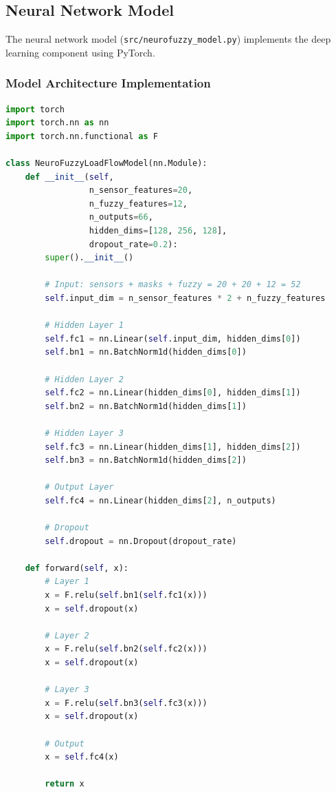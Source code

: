 \documentclass[12pt,a4paper]{report}
\begin{document}
\subsection{Neural Network Model}

The neural network model (\texttt{src/neurofuzzy\_model.py}) implements the deep learning component using PyTorch.

\subsubsection{Model Architecture Implementation}

\begin{lstlisting}[language=Python, caption={Neural Network Architecture}]
import torch
import torch.nn as nn
import torch.nn.functional as F

class NeuroFuzzyLoadFlowModel(nn.Module):
    def __init__(self, 
                 n_sensor_features=20,
                 n_fuzzy_features=12,
                 n_outputs=66,
                 hidden_dims=[128, 256, 128],
                 dropout_rate=0.2):
        super().__init__()
        
        # Input: sensors + masks + fuzzy = 20 + 20 + 12 = 52
        self.input_dim = n_sensor_features * 2 + n_fuzzy_features
        
        # Hidden Layer 1
        self.fc1 = nn.Linear(self.input_dim, hidden_dims[0])
        self.bn1 = nn.BatchNorm1d(hidden_dims[0])
        
        # Hidden Layer 2
        self.fc2 = nn.Linear(hidden_dims[0], hidden_dims[1])
        self.bn2 = nn.BatchNorm1d(hidden_dims[1])
        
        # Hidden Layer 3
        self.fc3 = nn.Linear(hidden_dims[1], hidden_dims[2])
        self.bn3 = nn.BatchNorm1d(hidden_dims[2])
        
        # Output Layer
        self.fc4 = nn.Linear(hidden_dims[2], n_outputs)
        
        # Dropout
        self.dropout = nn.Dropout(dropout_rate)
        
    def forward(self, x):
        # Layer 1
        x = F.relu(self.bn1(self.fc1(x)))
        x = self.dropout(x)
        
        # Layer 2
        x = F.relu(self.bn2(self.fc2(x)))
        x = self.dropout(x)
        
        # Layer 3
        x = F.relu(self.bn3(self.fc3(x)))
        x = self.dropout(x)
        
        # Output
        x = self.fc4(x)
        
        return x
\end{lstlisting}
\end{document}
